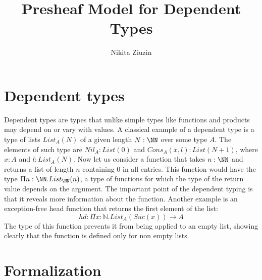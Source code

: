 \def\pathToRoot{../../}

\usepackage{todonotes}
\usepackage{semantic}

\DeclareMathOperator{\core}{core}

\newtheorem{definition}{Definition}
\newtheorem{example}{Example}
\newtheorem{lemma}{Lemma}

\title{Presheaf Model for Dependent Types}

\author{Nikita Ziuzin}



\maketitle

\section*{Dependent types}

Dependent types are types that unlike simple types like functions and products
may depend on or vary with values.  A classical example of a dependent type is
a type of lists $List_{A}(N)$ of a given length $N : \NN$ over some
type $A$. The elements of such type are $Nil_{A} : List(0)$ and
$Cons_{A}(x, l) : List(N+1)$, where $x : {A}$ and $l : List_{A}(N)$.
Now let us consider a function that takes $n : \NN$ and returns a list of
length $n$ containing $0$ in all entries.  This function would have the type
$\Pi n : \NN.List_\NN(n)$, a type of functions for which the type
of the return value depends on the argument.  The important point of the
dependent typing is that it reveals more information about the function.
Another example is an exception-free head function that returns the first
element of the list:
\[
  hd: \Pi x : \mathbb{N}.List_{A}(Suc(x)) \to A
\]
The type of this function prevents it from being applied to an empty list,
showing clearly that the function is defined only for non empty lists.

\section*{Formalization}

